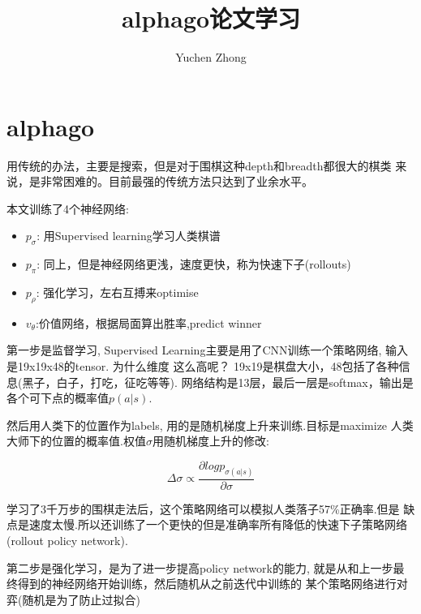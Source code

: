 \documentclass{article}
\title{alphago论文学习}
\author{Yuchen Zhong}
\begin{document}
        \maketitle

        \section{alphago}
            用传统的办法，主要是搜索，但是对于围棋这种depth和breadth都很大的棋类
            来说，是非常困难的。目前最强的传统方法只达到了业余水平。

            本文训练了4个神经网络:
            \begin{itemize}
                \item $p_{\sigma}$: 用Supervised learning学习人类棋谱
                \item $p_{\pi}$: 同上，但是神经网络更浅，速度更快，称为快速下子(rollouts)
                \item $p_{\rho}$: 强化学习，左右互搏来optimise
                \item $v_{\theta}$:价值网络，根据局面算出胜率,predict winner
            \end{itemize}

            第一步是监督学习,
            Supervised Learning主要是用了CNN训练一个策略网络,
            输入是19x19x48的tensor. 为什么维度
            这么高呢？ 19x19是棋盘大小，48包括了各种信息(黑子，白子，打吃，征吃等等).
            网络结构是13层，最后一层是softmax，输出是各个可下点的概率值$p(a|s)$.

            然后用人类下的位置作为labels, 用的是随机梯度上升来训练.目标是maximize
            人类大师下的位置的概率值.权值$\sigma$用随机梯度上升的修改:

            \begin{equation}
                \Delta \sigma \propto \frac{\partial log p_{\sigma(a|s)}}{\partial \sigma}
            \end{equation}

            

            学习了3千万步的围棋走法后，这个策略网络可以模拟人类落子57\%正确率.但是
            缺点是速度太慢.所以还训练了一个更快的但是准确率所有降低的快速下子策略网络
            (rollout policy network).

            第二步是强化学习，是为了进一步提高policy network的能力,
            就是从和上一步最终得到的神经网络开始训练，然后随机从之前迭代中训练的
            某个策略网络进行对弈(随机是为了防止过拟合)
            
\end{document}
